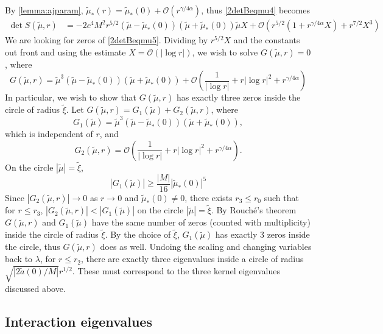 \documentclass[thesis.tex]{subfiles}
\begin{document}
By \cref{lemma:ajparam}, $\tilde{\mu}_*(r) = \tilde{\mu}_*(0) + \mathcal{O}(r^{\gamma/4 \alpha})$, thus \cref{2detBeqmu4} becomes
\begin{equation}\label{2detBeqmu5}
\begin{aligned}
\det S(\tilde{\mu}, r) &= -2 c^4 M^2 r^{5/2} (\tilde{\mu} - \tilde{\mu}_*(0)) (\tilde{\mu} + \tilde{\mu}_*(0)) \tilde{\mu} X + \mathcal{O}\left( r^{5/2} \left( 1 + r^{\gamma/4 \alpha} X \right) + r^{7/2}X^3 \right)
\end{aligned}
\end{equation}
We are looking for zeros of \cref{2detBeqmu5}. Dividing by $r^{5/2}X$ and the constants out front and using the estimate $X = \mathcal{O}(|\log r|)$, we wish to solve $G(\tilde{\mu}, r) = 0$, where
\begin{equation}\label{2peigG}
G(\tilde{\mu}, r) = \tilde{\mu}^3 (\tilde{\mu} - \tilde{\mu}_*(0)) (\tilde{\mu} + \tilde{\mu}_*(0)) + \mathcal{O}\left( \frac{1}{|\log r|} + r |\log r|^2 + r^{\gamma/4 \alpha} \right)
\end{equation}
In particular, we wish to show that $G(\tilde{\mu}, r)$ has exactly three zeros inside the circle of radius $\tilde{\xi}$. Let $G(\tilde{\mu}, r) = G_1(\tilde{\mu}) + G_2(\tilde{\mu}, r)$, where 
\[
G_1(\tilde{\mu}) = \tilde{\mu}^3 (\tilde{\mu} - \tilde{\mu}_*(0)) (\tilde{\mu} + \tilde{\mu}_*(0)),
\]
which is independent of $r$, and
\[
G_2(\tilde{\mu}, r) = \mathcal{O}\left( \frac{1}{|\log r|} + r |\log r|^2 + r^{\gamma/4 \alpha} \right).
\]
On the circle $|\tilde{\mu}| = \tilde{\xi}$,
\[
|G_1(\tilde{\mu})| \geq \frac{|M|}{16}|\tilde{\mu}_*(0)|^5
\]
Since $|G_2(\tilde{\mu}, r)| \rightarrow 0$ as $r \rightarrow 0$ and $\tilde{\mu}_*(0) \neq 0$, there exists $r_3 \leq r_0$ such that for $r \leq r_3$, $|G_2(\tilde{\mu}, r)| < |G_1(\tilde{\mu})|$ on the circle $|\tilde{\mu}| = \tilde{\xi}$. By Rouch\'{e}'s theorem $G(\tilde{\mu}, r)$ and $G_1(\tilde{\mu})$ have the same number of zeros (counted with multiplicity) inside the circle of radius $\tilde{\xi}$. By the choice of $\tilde{\xi}$, $G_1(\tilde{\mu})$ has exactly 3 zeros inside the circle, thus $G(\tilde{\mu}, r)$ does as well. Undoing the scaling and changing variables back to $\lambda$, for $r \leq r_2$, there are exactly three eigenvalues inside a circle of radius $\sqrt{|2\tilde{a}(0)/M|}r^{1/2}$. These must correspond to the three kernel eigenvalues discussed above.

\subsection{Interaction eigenvalues}\label{sec:assyminteigs}
\end{document}
